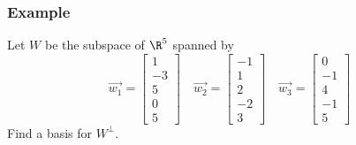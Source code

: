 \documentclass{math}
\begin{document}
\subsubsection*{Example}
Let \( W \) be the subspace of \( \R^5 \) spanned by
\[ \vec{w_1} = \begin{bmatrix}1 \\ -3 \\ 5 \\ 0 \\ 5\end{bmatrix}\quad
  \vec{w_2} = \begin{bmatrix}-1 \\ 1 \\ 2 \\ -2 \\ 3\end{bmatrix}\quad
  \vec{w_3} = \begin{bmatrix}0 \\ -1 \\ 4 \\ -1 \\ 5\end{bmatrix} \]
Find a basis for \( W^{\bot} \).
\end{document}
